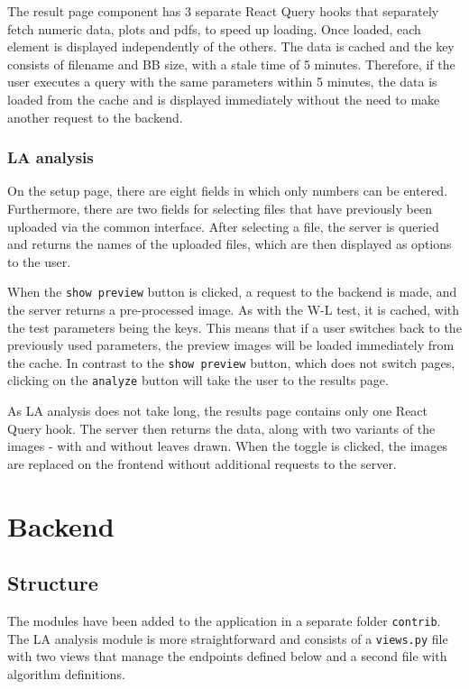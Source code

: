 The result page component has 3 separate React Query hooks that separately fetch numeric data, plots and pdfs, to speed up loading. Once loaded, each element is displayed independently of the others. The data is cached and the key consists of filename and BB size, with a stale time of 5 minutes. Therefore, if the user executes a query with the same parameters within 5 minutes, the data is loaded from the cache and is displayed immediately without the need to make another request to the backend.

\subsubsection{LA analysis}

On the setup page, there are eight fields in which only numbers can be entered. Furthermore, there are two fields for selecting files that have previously been uploaded via the common interface. After selecting a file, the server is queried and returns the names of the uploaded files, which are then displayed as options to the user.

When the \verb|show preview| button is clicked, a request to the backend is made, and the server returns a pre-processed image. As with the W-L test, it is cached, with the test parameters being the keys. This means that if a user switches back to the previously used parameters, the preview images will be loaded immediately from the cache. In contrast to the \verb|show preview| button, which does not switch pages, clicking on the \verb|analyze| button will take the user to the results page.

As LA analysis does not take long, the results page contains only one React Query hook. The server then returns the data, along with two variants of the images - with and without leaves drawn. When the toggle is clicked, the images are replaced on the frontend without additional requests to the server.

\section{Backend}
\label{sec:techWL}
\label{sec:techLA}

\subsection{Structure}

The modules have been added to the application in a separate folder \verb|contrib|. The LA analysis module is more straightforward and consists of a \verb|views.py| file with two views that manage the endpoints defined below and a second file with algorithm definitions.

